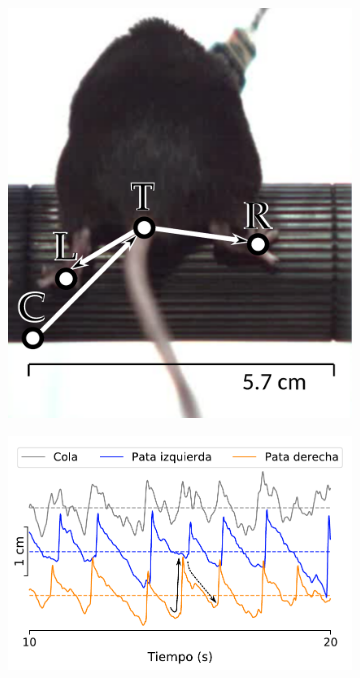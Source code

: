 \begin{figure}[!htbp]
    \centering
    \begin{subfigure}{.35\textwidth}
        \includegraphics[width=1\linewidth]{figuras/expertos/videos/frame.pdf}
        \caption{}
    \end{subfigure}
    \begin{subfigure}{.64\textwidth}
        \includegraphics[width=1\linewidth]{figuras/expertos/videos/positions.pdf}

\end{subfigure}
\end{figure}
